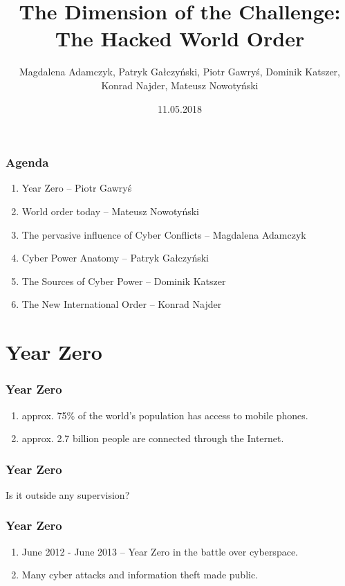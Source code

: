 \documentclass[xcolor=table]{beamer}
\title[The Hacked World  Order]{The Dimension of the Challenge: The Hacked World  Order}
\author[M. Adamczyk, P. Gałczyński, P. Gawryś, D. Katszer, K. Najder, M. Nowotyński]{Magdalena Adamczyk, Patryk Gałczyński, Piotr Gawryś, Dominik Katszer, Konrad Najder, Mateusz Nowotyński}
\date{11.05.2018}
\begin{document}
 
\frame{\titlepage}
 
\begin{frame}
\frametitle{Agenda}
\begin{enumerate}
\item Year Zero -- Piotr Gawryś
\item World order today -- Mateusz Nowotyński
\item The pervasive influence of Cyber Conflicts -- Magdalena Adamczyk
\item Cyber Power Anatomy -- Patryk Gałczyński
\item The Sources of Cyber Power -- Dominik Katszer
\item The New International Order -- Konrad Najder
\end{enumerate}
\end{frame}

\section{Year Zero}
\begin{frame}
\frametitle{Year Zero}
\begin{enumerate}
\item \large{approx. 75\% of the world's population has access to mobile phones.}
\item \large{approx. 2.7 billion people are connected through the Internet.}
\end{enumerate}
\end{frame}

\begin{frame}
\frametitle{Year Zero}
\Huge{\centerline{Is it outside any supervision?}}
\end{frame}

\begin{frame}
\frametitle{Year Zero}
\begin{enumerate}
\item \large{June 2012 - June 2013 -- Year Zero in the battle over cyberspace. }
\item \large{Many cyber attacks and information theft made public.}
\end{enumerate}
\end{frame}
\end{document}
